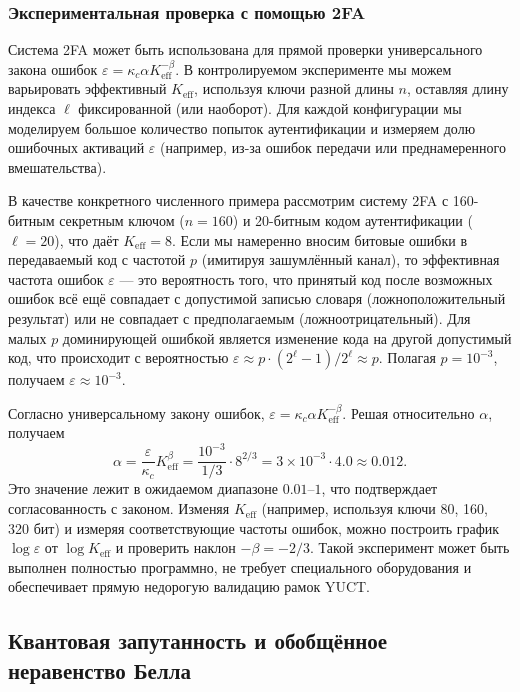 \documentclass[12pt,a4paper]{article}
\theoremstyle{remark}
\newcommand{\Keff}{K_{\mathrm{eff}}}
\begin{document}
	\subsubsection{Экспериментальная проверка с помощью 2FA}
	\label{subsec:2fa-experiment}
	
	Система 2FA может быть использована для прямой проверки универсального закона ошибок $\varepsilon = \kappa_c \alpha K_{\mathrm{eff}}^{-\beta}$. В контролируемом эксперименте мы можем варьировать эффективный $\Keff$, используя ключи разной длины $n$, оставляя длину индекса $\ell$ фиксированной (или наоборот). Для каждой конфигурации мы моделируем большое количество попыток аутентификации и измеряем долю ошибочных активаций $\varepsilon$ (например, из-за ошибок передачи или преднамеренного вмешательства).
	
	В качестве конкретного численного примера рассмотрим систему 2FA с 160-битным секретным ключом ($n=160$) и 20-битным кодом аутентификации ($\ell=20$), что даёт $\Keff = 8$. Если мы намеренно вносим битовые ошибки в передаваемый код с частотой $p$ (имитируя зашумлённый канал), то эффективная частота ошибок $\varepsilon$ — это вероятность того, что принятый код после возможных ошибок всё ещё совпадает с допустимой записью словаря (ложноположительный результат) или не совпадает с предполагаемым (ложноотрицательный). Для малых $p$ доминирующей ошибкой является изменение кода на другой допустимый код, что происходит с вероятностью $\varepsilon \approx p \cdot (2^\ell -1)/2^\ell \approx p$. Полагая $p = 10^{-3}$, получаем $\varepsilon \approx 10^{-3}$.
	
	Согласно универсальному закону ошибок, $\varepsilon = \kappa_c \alpha K_{\mathrm{eff}}^{-\beta}$. Решая относительно $\alpha$, получаем
	\[
	\alpha = \frac{\varepsilon}{\kappa_c} K_{\mathrm{eff}}^{\beta} = \frac{10^{-3}}{1/3} \cdot 8^{2/3} = 3 \times 10^{-3} \cdot 4.0 \approx 0.012.
	\]
	Это значение лежит в ожидаемом диапазоне $0.01$–$1$, что подтверждает согласованность с законом. Изменяя $\Keff$ (например, используя ключи 80, 160, 320 бит) и измеряя соответствующие частоты ошибок, можно построить график $\log \varepsilon$ от $\log \Keff$ и проверить наклон $-\beta = -2/3$. Такой эксперимент может быть выполнен полностью программно, не требует специального оборудования и обеспечивает прямую недорогую валидацию рамок YUCT.
	
	\subsection{Квантовая запутанность и обобщённое неравенство Белла}
	
\end{document}
